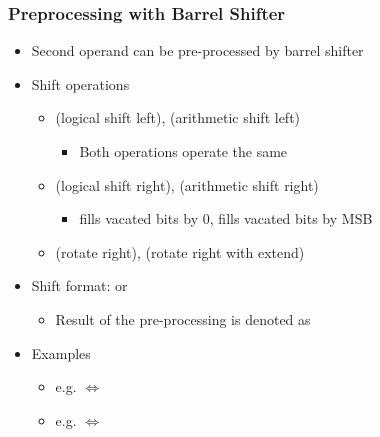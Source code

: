 \subsubsection*{Preprocessing with Barrel Shifter}
\begin{itemize}
    \item Second operand can be pre-processed by barrel shifter
    \item Shift operations
    \begin{itemize}
        \item {}(logical shift left), (arithmetic shift left)
        \begin{itemize}
            \item Both operations operate the same
        \end{itemize}
        \item {}(logical shift right), (arithmetic shift right)
        \begin{itemize}
            \item {} fills vacated bits by 0,  fills vacated bits by MSB
        \end{itemize}
        \item {}(rotate right), (rotate right with extend)
    \end{itemize}
    \item Shift format:  or 
    \begin{itemize}
        \item Result of the pre-processing is denoted as 
    \end{itemize}
    \item Examples
    \begin{itemize}
        \item e.g.  $\iff$ 
        \item e.g.  $\iff$ 
    \end{itemize}
\end{itemize}

